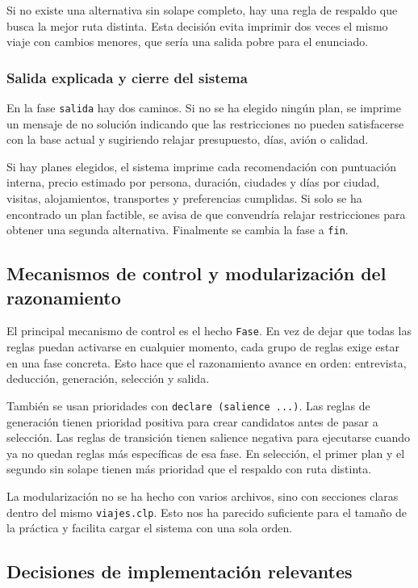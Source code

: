 \documentclass[11pt,a4paper]{article}
\begin{document}
Si no existe una alternativa sin solape completo, hay una regla de respaldo que
busca la mejor ruta distinta. Esta decisi\'on evita imprimir dos veces el mismo
viaje con cambios menores, que ser\'ia una salida pobre para el enunciado.

\subsubsection{Salida explicada y cierre del sistema}
En la fase \texttt{salida} hay dos caminos. Si no se ha elegido ning\'un plan,
se imprime un mensaje de no soluci\'on indicando que las restricciones no pueden
satisfacerse con la base actual y sugiriendo relajar presupuesto, d\'ias, avi\'on
o calidad.

Si hay planes elegidos, el sistema imprime cada recomendaci\'on con puntuaci\'on
interna, precio estimado por persona, duraci\'on, ciudades y d\'ias por ciudad,
visitas, alojamientos, transportes y preferencias cumplidas. Si solo se ha
encontrado un plan factible, se avisa de que convendr\'ia relajar restricciones
para obtener una segunda alternativa. Finalmente se cambia la fase a
\texttt{fin}.

\subsection{Mecanismos de control y modularizaci\'on del razonamiento}
El principal mecanismo de control es el hecho \texttt{Fase}. En vez de dejar
que todas las reglas puedan activarse en cualquier momento, cada grupo de
reglas exige estar en una fase concreta. Esto hace que el razonamiento avance
en orden: entrevista, deducci\'on, generaci\'on, selecci\'on y salida.

Tambi\'en se usan prioridades con \texttt{declare (salience ...)}. Las reglas de
generaci\'on tienen prioridad positiva para crear candidatos antes de pasar a
selecci\'on. Las reglas de transici\'on tienen salience negativa para ejecutarse
cuando ya no quedan reglas m\'as espec\'ificas de esa fase. En selecci\'on, el
primer plan y el segundo sin solape tienen m\'as prioridad que el respaldo con
ruta distinta.

La modularizaci\'on no se ha hecho con varios archivos, sino con secciones
claras dentro del mismo \texttt{viajes.clp}. Esto nos ha parecido suficiente
para el tama\~no de la pr\'actica y facilita cargar el sistema con una sola
orden.

\subsection{Decisiones de implementaci\'on relevantes}
\end{document}
